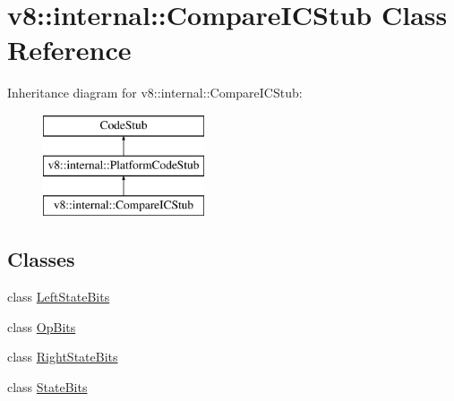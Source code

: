 \hypertarget{classv8_1_1internal_1_1_compare_i_c_stub}{}\section{v8\+:\+:internal\+:\+:Compare\+I\+C\+Stub Class Reference}
\label{classv8_1_1internal_1_1_compare_i_c_stub}
Inheritance diagram for v8\+:\+:internal\+:\+:Compare\+I\+C\+Stub\+:\begin{figure}[H]
\begin{center}
\leavevmode
\includegraphics[height=3.000000cm]{classv8_1_1internal_1_1_compare_i_c_stub}
\end{center}
\end{figure}
\subsection*{Classes}
\begin{DoxyCompactItemize}
\item 
class \hyperlink{classv8_1_1internal_1_1_compare_i_c_stub_1_1_left_state_bits}{Left\+State\+Bits}
\item 
class \hyperlink{classv8_1_1internal_1_1_compare_i_c_stub_1_1_op_bits}{Op\+Bits}
\item 
class \hyperlink{classv8_1_1internal_1_1_compare_i_c_stub_1_1_right_state_bits}{Right\+State\+Bits}
\item 
class \hyperlink{classv8_1_1internal_1_1_compare_i_c_stub_1_1_state_bits}{State\+Bits}
\end{DoxyCompactItemize}
